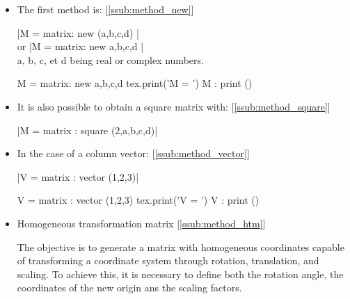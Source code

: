 \begin{itemize}

\item  The first method is: [\ref{ssub:method_new}]

  \begin{minipage}{.5\textwidth}
    \begin{mybox}
       |M = matrix: new ({{a,b},{c,d}}) | \\
       or |M = matrix: new {{a,b},{c,d}} | \\
       a, b, c, et d being real or complex numbers.
    \end{mybox}
  \end{minipage}
  \begin{minipage}{.5\textwidth}
       \begin{tkzelements}
         M = matrix: new {{a,b},{c,d}}
         tex.print('M = ') M : print ()
       \end{tkzelements}

  \end{minipage}


\item  It is also possible to obtain a square matrix with: [\ref{ssub:method_square}]

  \begin{mybox}
  |M = matrix : square (2,a,b,c,d)| 
  \end{mybox}

\item  In the case of a column vector: [\ref{ssub:method_vector}]

\begin{minipage}{.5\textwidth}
  \begin{mybox}
  |V = matrix : vector (1,2,3)| 
  \end{mybox}
\end{minipage}
\begin{minipage}{.5\textwidth}
 \begin{tkzelements}
  V = matrix : vector (1,2,3)  tex.print('V = ') V : print ()
  \end{tkzelements}
\end{minipage}

\item  Homogeneous transformation matrix [\ref{ssub:method_htm}]

  The objective is to generate a matrix with homogeneous coordinates capable of transforming a coordinate system through rotation, translation, and scaling. To achieve this, it is necessary to define both the rotation angle, the coordinates of the new origin ans the scaling factors.


\end{itemize}
